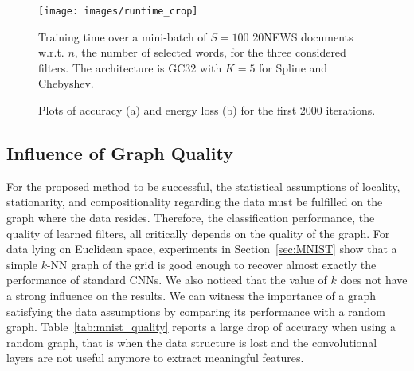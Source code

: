 \documentclass{article}
\newcommand{\tabref}[1]{Table~\ref{tab:#1}}
\newcommand{\secref}[1]{Section~\ref{sec:#1}}
\begin{document}
\begin{figure}[ht]
\centering
\vspace{-20pt}
\texttt{[image: images/runtime\_crop]}
\caption{Training time over a mini-batch of $S=100$ 20NEWS documents w.r.t. $n$, the
number of selected words, for the three considered filters. The architecture is
GC32 with $K=5$ for Spline and Chebyshev.}
\label{fig:runtime}
\end{figure}

\begin{figure}[h!]
\centering
{}
\hfill
{}
\caption{Plots of accuracy (a) and energy loss (b) for the first 2000
iterations.}
\label{fig:convergence}
\end{figure}











\subsection{Influence of Graph Quality} \label{sec:graph_quality}

For the proposed method to be successful, the statistical assumptions of  locality, stationarity, and compositionality regarding the data must be fulfilled on the graph where the data resides. Therefore, the classification performance, the quality of learned filters, all critically depends on the quality of the graph. For data lying on Euclidean space, experiments in    
 \secref{MNIST} show that a simple $k$-NN graph of the grid is good enough to recover almost exactly the performance of standard CNNs. We also noticed that the value of $k$ does not have a strong influence on the results. We can witness the importance of a graph satisfying the data assumptions by comparing its performance with a random
graph. \tabref{mnist_quality} reports a large drop of accuracy when using a random graph, that is when the data structure is lost and the convolutional layers are not useful anymore to extract meaningful features.
\end{document}
